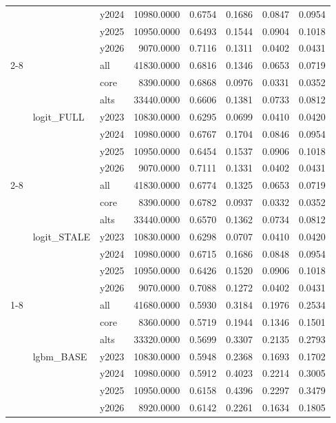 \begin{tabular}{lllrrrrr}
 &  & y2024 & 10980.0000 & 0.6754 & 0.1686 & 0.0847 & 0.0954 \\
 &  & y2025 & 10950.0000 & 0.6493 & 0.1544 & 0.0904 & 0.1018 \\
 &  & y2026 & 9070.0000 & 0.7116 & 0.1311 & 0.0402 & 0.0431 \\
\cline{2-8}
 & \multirow[t]{7}{*}{logit_FULL} & all & 41830.0000 & 0.6816 & 0.1346 & 0.0653 & 0.0719 \\
 &  & core & 8390.0000 & 0.6868 & 0.0976 & 0.0331 & 0.0352 \\
 &  & alts & 33440.0000 & 0.6606 & 0.1381 & 0.0733 & 0.0812 \\
 &  & y2023 & 10830.0000 & 0.6295 & 0.0699 & 0.0410 & 0.0420 \\
 &  & y2024 & 10980.0000 & 0.6767 & 0.1704 & 0.0846 & 0.0954 \\
 &  & y2025 & 10950.0000 & 0.6454 & 0.1537 & 0.0906 & 0.1018 \\
 &  & y2026 & 9070.0000 & 0.7111 & 0.1331 & 0.0402 & 0.0431 \\
\cline{2-8}
 & \multirow[t]{7}{*}{logit_STALE} & all & 41830.0000 & 0.6774 & 0.1325 & 0.0653 & 0.0719 \\
 &  & core & 8390.0000 & 0.6782 & 0.0937 & 0.0332 & 0.0352 \\
 &  & alts & 33440.0000 & 0.6570 & 0.1362 & 0.0734 & 0.0812 \\
 &  & y2023 & 10830.0000 & 0.6298 & 0.0707 & 0.0410 & 0.0420 \\
 &  & y2024 & 10980.0000 & 0.6715 & 0.1686 & 0.0848 & 0.0954 \\
 &  & y2025 & 10950.0000 & 0.6426 & 0.1520 & 0.0906 & 0.1018 \\
 &  & y2026 & 9070.0000 & 0.7088 & 0.1272 & 0.0402 & 0.0431 \\
\cline{1-8} \cline{2-8}
\multirow[t]{42}{*}{dd10_7d} & \multirow[t]{7}{*}{lgbm_BASE} & all & 41680.0000 & 0.5930 & 0.3184 & 0.1976 & 0.2534 \\
 &  & core & 8360.0000 & 0.5719 & 0.1944 & 0.1346 & 0.1501 \\
 &  & alts & 33320.0000 & 0.5699 & 0.3307 & 0.2135 & 0.2793 \\
 &  & y2023 & 10830.0000 & 0.5948 & 0.2368 & 0.1693 & 0.1702 \\
 &  & y2024 & 10980.0000 & 0.5912 & 0.4023 & 0.2214 & 0.3005 \\
 &  & y2025 & 10950.0000 & 0.6158 & 0.4396 & 0.2297 & 0.3479 \\
 &  & y2026 & 8920.0000 & 0.6142 & 0.2261 & 0.1634 & 0.1805 \\

\end{tabular}
